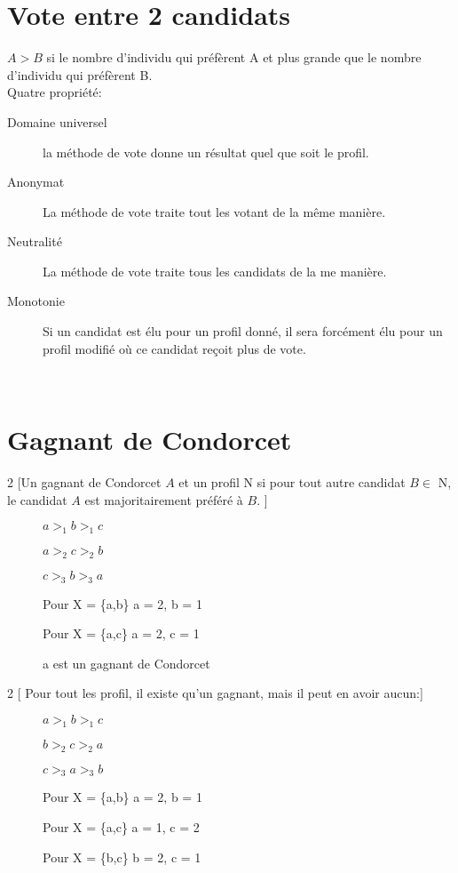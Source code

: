 \section{Vote entre 2 candidats}
$A > B$ si le nombre d'individu qui préfèrent A et plus grande que le nombre d'individu qui préfèrent B.\\

Quatre propriété:
\begin{description}
\item[Domaine universel] la méthode de vote donne un résultat quel que soit le profil.
\item[Anonymat] La méthode de vote traite tout les votant de la même manière.
\item[Neutralité] La méthode de vote traite tous les candidats de la me manière.
\item[Monotonie] Si un candidat est élu pour un profil donné, il sera forcément élu pour un profil modifié où ce candidat reçoit plus de vote.
\end{description}
\ \\

\section{Gagnant de Condorcet}
\begin{multicols}{2}
[Un gagnant de Condorcet $A$ et un profil N si pour tout autre candidat $B \in$ N, le candidat $A$ est majoritairement préféré à $B$.
]
\begin{description}
\item[] $a >_1 b >_1 c$
\item[] $a >_2 c >_2 b$
\item[] $c >_3 b >_3 a$
\end{description}
\begin{description}
\item[] Pour X = \{a,b\} a = 2, b = 1
\item[] Pour X = \{a,c\} a = 2, c = 1
\item[] a est un gagnant de Condorcet
\end{description}
\end{multicols}

\begin{multicols}{2}
[
Pour tout les profil, il existe qu'un gagnant, mais il peut en avoir aucun:]
\begin{description}
\item[] $a >_1 b >_1 c$
\item[] $b >_2 c >_2 a$
\item[] $c >_3 a >_3 b$
\end{description}
\begin{description}
\item[] Pour X = \{a,b\} a = 2, b = 1
\item[] Pour X = \{a,c\} a = 1, c = 2
\item[] Pour X = \{b,c\} b = 2, c = 1
\end{description}
\end{multicols}

